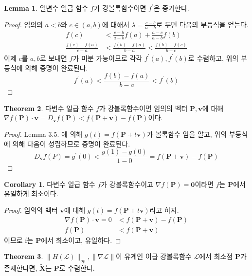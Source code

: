 \documentclass[a4paper,20pt]{article}
\theoremstyle{definition}
\newtheorem{theorem}{Theorem}[section]
\newtheorem{corollary}{Corollary}[theorem]
\newtheorem{lemma}[theorem]{Lemma}
\newcommand{\curve}[1][X]{\tilde{\mathbf{#1}}}
\begin{document}
\begin{lemma}
일변수 일급 함수 $f$가 강볼록함수이면 $f^{\prime}$은 증가한다.
\end{lemma}
\begin{proof}
임의의 $a<b$와 $c \in (a,b)$에 대해서 $\lambda=\frac{c-b}{a-b}$로 두면 다음의 부등식을 얻는다.
\begin{align*}
f(c)&<\frac{c-b}{a-b}f(a)+\frac{a-c}{a-b}f(b) \\
\frac{f(c)-f(a)}{c-a}&<\frac{f(b)-f(a)}{b-a}<\frac{f(b)-f(c)}{b-c}
\end{align*}
이제 $c$를 $a,b$로 보내면 $f$가 미분 가능이므로 각각 $f^{\prime}(a),f^{\prime}(b)$로 수렴하고, 위의 부등식에 의해 증명이 완료된다.
$$f^{\prime}(a)<\frac{f(b)-f(a)}{b-a}< f^{\prime}(b)$$
\end{proof}

\newpage
\begin{theorem}
다변수 일급 함수 $f$가 강볼록함수이면 임의의 벡터 $\mathbf{P},\mathbf{v}$에 대해 $\nabla f(\mathbf{P})\cdot \mathbf{v}=D_{\mathbf{v}}f(\mathbf{P})< f(\mathbf{P}+\mathbf{v})-f(\mathbf{P})$이다.
\end{theorem}
\begin{proof}
Lemma 3.5. 에 의해 $g(t)=f(\mathbf{P}+t\mathbf{v})$가 볼록함수 임을 알고, 위의 부등식에 의해 다음이 성립하므로 증명이 완료된다.
$$
D_{\mathbf{v}}f(P)=g^{\prime}(0)<\frac{g(1)-g(0)}{1-0}=f(\mathbf{P}+\mathbf{v})-f(\mathbf{P})
$$
\end{proof}

\begin{corollary}
다변수 일급 함수 $f$가 강볼록함수이고 $\nabla f(\mathbf{P})=\mathbf{0}$이라면 $f$는 $\mathbf{P}$에서 유일하게 최소이다.
\end{corollary}
\begin{proof}
임의의 벡터 $\mathbf{v}$에 대해 $g(t)=f(\mathbf{P}+t\mathbf{v})$라고 하자. 
\begin{align*}
\nabla f(\mathbf{P})\cdot\mathbf{v}=0&< f(\mathbf{P}+\mathbf{v})-f(\mathbf{P}) \\ f(\mathbf{P})&< f(\mathbf{P}+\mathbf{v})
\end{align*}
이므로 f는 $\mathbf{P}$에서 최소이고, 유일하다.
\end{proof}


\begin{theorem}
$\|H(\mathcal{L})\|_{op}, \|\nabla\mathcal{L}\|$이 유계인 이급 강볼록함수 $\mathcal{L}$에서 최소점 $\mathbf{P}$가 존재한다면, $\curve$는 $\mathbf{P}$로 수렴한다.
\end{theorem}
\end{document}
